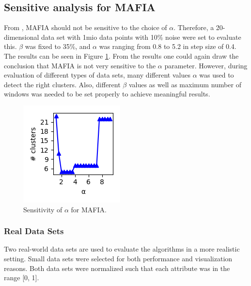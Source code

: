 \subsection{Sensitive analysis for MAFIA}
From \cite{mafia}, MAFIA should not be sensitive to the choice of $\alpha$. Therefore, a 20-dimensional data set with 1mio data points with 10\% noise were set to evaluate this. $\beta$ was fixed to 35\%, and $\alpha$ was ranging from 0.8 to 5.2 in step size of 0.4. The results can be seen in Figure \ref{fig:sensitivity_alpha}. From the results one could again draw the conclusion that MAFIA is not very sensitive to the $\alpha$ parameter. However, during evaluation of different types of data sets, many different values $\alpha$ was used to detect the right clusters. Also, different $\beta$ values as well as maximum number of windows was needed to be set properly to achieve meaningful results.
\begin{figure}[H]
    \vspace*{-0.5cm}
    \centering
    \includegraphics[scale=0.45]{figures/sensitivity_alpha.png}
    \caption{Sensitivity of $\alpha$ for MAFIA.}
    \label{fig:sensitivity_alpha}
\end{figure}

\subsubsection{Real Data Sets}
Two real-world data sets are used to evaluate the algorithms in a more realistic setting. Small data sets were selected for both performance and visualization reasons. Both data sets were normalized such that each attribute was in the range [0, 1].

